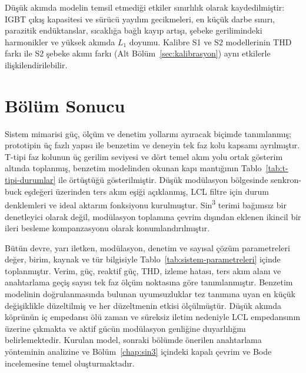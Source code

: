 Düşük akımda modelin temsil etmediği etkiler sınırlılık olarak kaydedilmiştir: IGBT çıkış kapasitesi ve sürücü yayılım gecikmeleri, en küçük darbe sınırı, parazitik endüktanslar, sıcaklığa bağlı kayıp artışı, şebeke gerilimindeki harmonikler ve yüksek akımda $L_1$ doyumu. Kalibre S1 ve S2 modellerinin THD farkı ile S2 şebeke akımı farkı (Alt Bölüm~\ref{sec:kalibrasyon}) aynı etkilerle ilişkilendirilebilir.

\section{Bölüm Sonucu}

Sistem mimarisi güç, ölçüm ve denetim yollarını ayıracak biçimde tanımlanmış; prototipin üç fazlı yapısı ile benzetim ve deneyin tek faz kolu kapsamı ayrılmıştır. T-tipi faz kolunun üç gerilim seviyesi ve dört temel akım yolu ortak gösterim altında toplanmış, benzetim modelinden okunan kapı mantığının Tablo~\ref{tab:t-tipi-durumlar} ile örtüştüğü gösterilmiştir. Düşük modülasyon bölgesinde senkron-buck eşdeğeri üzerinden ters akım eşiği açıklanmış, LCL filtre için durum denklemleri ve ideal aktarım fonksiyonu kurulmuştur. Sin\textsuperscript{3} terimi bağımsız bir denetleyici olarak değil, modülasyon toplamına çevrim dışından eklenen ikincil bir ileri besleme kompanzasyonu olarak konumlandırılmıştır.

Bütün devre, yarı iletken, modülasyon, denetim ve sayısal çözüm parametreleri değer, birim, kaynak ve tür bilgisiyle Tablo~\ref{tab:sistem-parametreleri} içinde toplanmıştır. Verim, güç, reaktif güç, THD, izleme hatası, ters akım alanı ve anahtarlama geçiş sayısı tek faz ölçüm noktasına göre tanımlanmıştır. Benzetim modelinin doğrulanmasında bulunan uyumsuzluklar tez tanımına uyan en küçük değişiklikle düzeltilmiş ve her düzeltmenin etkisi ölçülmüştür. Düşük akımda köprünün iç empedansı ölü zaman ve süreksiz iletim nedeniyle LCL empedansının üzerine çıkmakta ve aktif gücün modülasyon genliğine duyarlılığını belirlemektedir. Kurulan model, sonraki bölümde önerilen anahtarlama yönteminin analizine ve Bölüm~\ref{chap:sin3} içindeki kapalı çevrim ve Bode incelemesine temel oluşturmaktadır.
